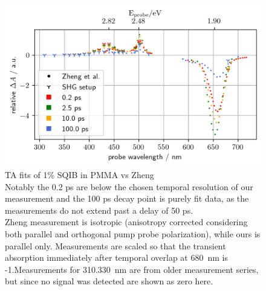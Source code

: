 \documentclass[twoside,openright]{scrreprt}
\begin{document}
\begin{figure}[hbtp]
\centering
\includegraphics[scale=1]{images/wavScanVsZheng.png}
\caption{TA fits of 1\% SQIB in PMMA vs Zheng\protect\cite{Zheng2020}\\ Notably the 0.2 ps are below the chosen temporal resolution of our measurement and the 100 ps decay point is purely fit data, as the measurements do not extend past a delay of 50 ps.\\
Zheng measurement is isotropic (anisotropy corrected considering both parallel and orthogonal pump probe polarization), while ours is parallel only. Measurements are scaled so that the transient absorption immediately after temporal overlap at \SI{680}{\nano\meter} is -1.Measurements for \SIlist{310, 330}{\nano\meter} are from older measurement series, but since no signal was detected are shown as zero here.\label{fig:TA_vsZheng}}
\end{figure}
\end{document}
